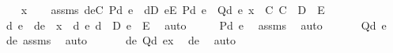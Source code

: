 \begin{isabellebody}
\ \ \isamarkupfalse%
\ x\isanewline
\ \ \isamarkupfalse%
\ assms{\isacharcolon}{\kern0pt}\ {\isachardoublequoteopen}{\isasymforall}{\isasymlangle}d{\isacharcomma}{\kern0pt}e{\isasymrangle}{\isasymin}C{\isachardot}{\kern0pt}\ P{\isacharparenleft}{\kern0pt}d{\isacharcomma}{\kern0pt}\ e{\isacharparenright}{\kern0pt}{\isachardoublequoteclose}\ {\isachardoublequoteopen}\ {\isasymforall}d{\isasymin}D{\isachardot}{\kern0pt}\ {\isasymforall}e{\isasymin}E{\isachardot}{\kern0pt}\ P{\isacharparenleft}{\kern0pt}d{\isacharcomma}{\kern0pt}\ e{\isacharparenright}{\kern0pt}\ {\isasymlongrightarrow}\ Q{\isacharparenleft}{\kern0pt}d{\isacharcomma}{\kern0pt}\ e{\isacharparenright}{\kern0pt}{\isachardoublequoteclose}\ {\isachardoublequoteopen}x\ {\isasymin}\ C{\isachardoublequoteclose}\ {\isachardoublequoteopen}C\ {\isasymsubseteq}\ D\ {\isasymtimes}\ E{\isachardoublequoteclose}\ \isanewline
\ \ \isamarkupfalse%
\ \isamarkupfalse%
\ d\ e\ \ de\ {\isacharcolon}{\kern0pt}\ {\isachardoublequoteopen}x\ {\isacharequal}{\kern0pt}\ {\isacharless}{\kern0pt}d{\isacharcomma}{\kern0pt}\ e{\isachargreater}{\kern0pt}{\isachardoublequoteclose}\ {\isachardoublequoteopen}d\ {\isasymin}\ D{\isachardoublequoteclose}\ {\isachardoublequoteopen}e\ {\isasymin}\ E{\isachardoublequoteclose}\ \isamarkupfalse%
\ auto\isanewline
\ \ \isamarkupfalse%
\ \isamarkupfalse%
\ {\isachardoublequoteopen}P{\isacharparenleft}{\kern0pt}d{\isacharcomma}{\kern0pt}\ e{\isacharparenright}{\kern0pt}{\isachardoublequoteclose}\ \isamarkupfalse%
\ assms\ \isamarkupfalse%
\ auto\ \isanewline
\ \ \isamarkupfalse%
\ \isamarkupfalse%
\ {\isachardoublequoteopen}Q{\isacharparenleft}{\kern0pt}d{\isacharcomma}{\kern0pt}\ e{\isacharparenright}{\kern0pt}{\isachardoublequoteclose}\ \isamarkupfalse%
\ de\ assms\ \isamarkupfalse%
\ auto\ \isanewline
\ \ \isamarkupfalse%
\ \isamarkupfalse%
\ {\isachardoublequoteopen}{\isacharparenleft}{\kern0pt}{\isasymlambda}{\isasymlangle}d{\isacharcomma}{\kern0pt}e{\isasymrangle}{\isachardot}{\kern0pt}\ Q{\isacharparenleft}{\kern0pt}d{\isacharcomma}{\kern0pt}\ e{\isacharparenright}{\kern0pt}{\isacharparenright}{\kern0pt}{\isacharparenleft}{\kern0pt}x{\isacharparenright}{\kern0pt}{\isachardoublequoteclose}\ \isamarkupfalse%
\ de\ \isamarkupfalse%
\ auto\isanewline
{}\isamarkupfalse%
%

\end{isabellebody}
